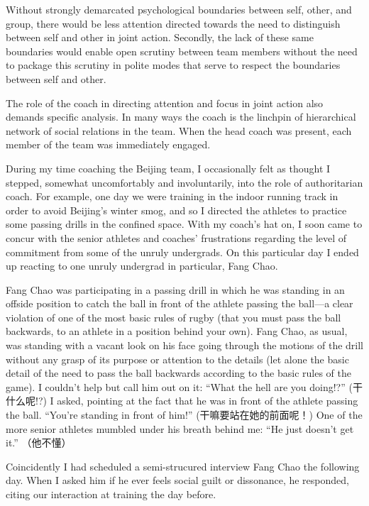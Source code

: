 \begin{CJK}{UTF8}{gbsn}
Without strongly demarcated psychological boundaries between self, other, and group, there would be less attention directed towards the need to distinguish between self and other in joint action.  Secondly, the lack of these same boundaries would enable open scrutiny between team members without the need to package this scrutiny in polite modes that serve to respect the boundaries between self and other.


The role of the coach in directing attention and focus in joint action also demands specific analysis.  In many ways the coach is the linchpin of hierarchical network of social relations in the team.  When the head coach was present, each member of the team was immediately engaged.

During my time coaching the Beijing team, I occasionally felt as thought I stepped, somewhat uncomfortably and involuntarily, into the role of authoritarian coach.  For example, one day we were training in the indoor running track in order to avoid Beijing's winter smog, and so I directed the athletes to practice some passing drills in the confined space. With my coach's hat on, I soon came to concur with the senior athletes and coaches' frustrations regarding the level of commitment from some of the unruly undergrads.  On this particular day I ended up reacting to one unruly undergrad in particular, Fang Chao.

Fang Chao was participating in a passing drill in which he was standing in an offside position to catch the ball in front of the athlete passing the ball---a clear violation of one of the most basic rules of rugby (that you must pass the ball backwards, to an athlete in a position behind your own).  Fang Chao, as usual, was standing with a vacant look on his face going through the motions of the drill without any grasp of its purpose or attention to the details (let alone the basic detail of the need to pass the ball backwards according to the basic rules of the game).  I couldn't help but call him out on it: ``What the hell are you doing!?'' (干什么呢!?) I asked, pointing at the fact that he was in front of the athlete passing the ball.  ``You're standing in front of him!'' (干嘛要站在她的前面呢！) One of the more senior athletes mumbled under his breath behind me: ``He just doesn't get it.'' （他不懂）

Coincidently I had scheduled a semi-strucured interview Fang Chao the following day. When I asked him if he ever feels social guilt or dissonance, he responded, citing our interaction at training the day before.


\end{CJK}
